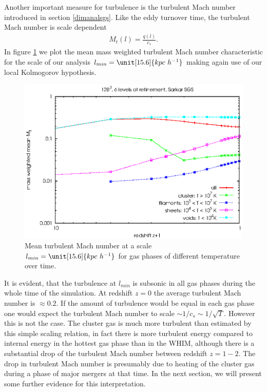 Another important measure for turbulence is the turbulent Mach number
introduced in section \ref{dimanalsgs}. Like the eddy turnover time, the
turbulent Mach number is scale dependent
\begin{align}
M_t(l)=\frac{q(l)}{c_s}.
\end{align}
In figure \ref{fig:machturb} we plot the mean mass weighted turbulent Mach
number characteristic for the scale of our analysis 
$l_{min}=\unit[15.6]{kpc\ h^{-1}}$ making again use of our local Kolmogorov
hypothesis.
\begin{figure}[tp]
\centering
\includegraphics[width=0.7\linewidth]{chapter9/machturb_red_sar.eps}
\caption{Mean turbulent Mach number at a scale 
$l_{min}=\unit[15.6]{kpc\ h^{-1}}$ for gas phases of different temperature over
time.}
\label{fig:machturb}
\end{figure}
It is evident, that the turbulence at $l_{min}$ is subsonic in all gas phases
during the whole time of the simulation. At redshift $z=0$ the average
turbulent Mach number is $\approx 0.2$. If the
amount of turbulence would be equal in each gas phase one would expect the
turbulent Mach number to scale $\sim 1/c_s \sim 1/\sqrt{T}$. However this is
not the case. The cluster gas is much more turbulent than estimated by this
simple scaling relation, in fact there is more turbulent energy compared to 
internal energy in the hottest gas phase than in the WHIM, although there is a
substantial drop of the turbulent Mach number between redshift $z=1-2$. The
drop in turbulent Mach number is presumably due to heating of the cluster gas
during a phase of major mergers at that time. In the next section, we will 
present some further evidence for this interpretation.  

